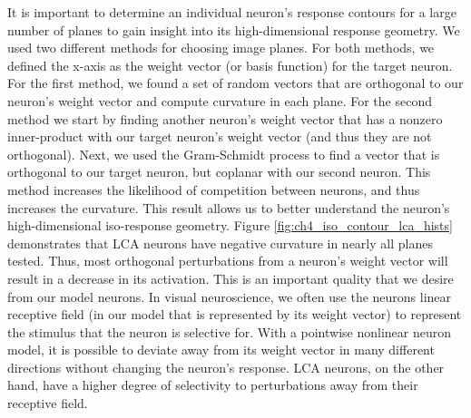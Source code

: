 It is important to determine an individual neuron’s response contours for a large number of planes to gain insight into its high-dimensional response geometry. We used two different methods for choosing image planes. For both methods, we defined the x-axis as the weight vector (or basis function) for the target neuron. For the first method, we found a set of random vectors that are orthogonal to our neuron’s weight vector and compute curvature in each plane. For the second method we start by finding another neuron’s weight vector that has a nonzero inner-product with our target neuron’s weight vector (and thus they are not orthogonal). Next, we used the Gram-Schmidt process to find a vector that is orthogonal to our target neuron, but coplanar with our second neuron. This method increases the likelihood of competition between neurons, and thus increases the curvature. This result allows us to better understand the neuron’s high-dimensional iso-response geometry. Figure \ref{fig:ch4_iso_contour_lca_hists} demonstrates that LCA neurons have negative curvature in nearly all planes tested. Thus, most orthogonal perturbations from a neuron's weight vector will result in a decrease in its activation. This is an important quality that we desire from our model neurons. In visual neuroscience, we often use the neurons linear receptive field (in our model that is represented by its weight vector) to represent the stimulus that the neuron is selective for. With a pointwise nonlinear neuron model, it is possible to deviate away from its weight vector in many different directions without changing the neuron's response. LCA neurons, on the other hand, have a higher degree of selectivity to perturbations away from their receptive field.

